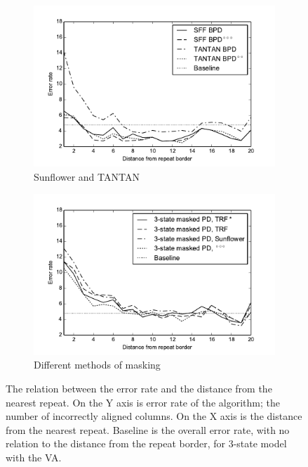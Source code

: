 \begin{figure}
\begin{center}
\begin{subfigure}{0.5\textwidth}
\includegraphics[width=\textwidth]{../figures/error_graph_sffvstantan.pdf}
\caption{Sunflower and TANTAN}\label{FIGURE:SFFTANTAN}
\end{subfigure}%
\begin{subfigure}{0.5\textwidth}
\includegraphics[width=\textwidth]{../figures/error_graph_3statemasking.pdf}
\caption{Different methods of masking}
\end{subfigure}%
\caption{
The relation between the error rate and the distance from the nearest repeat. On the Y
axis is error rate of the algorithm; the number of incorrectly aligned columns.
On the X axis is the distance from the nearest repeat. Baseline is the overall
error rate, with no relation to the distance from the repeat border, for
3-state model with the VA.
}\label{FIGURE:SFF_GRAPHS} 
\end{center}
\end{figure}

